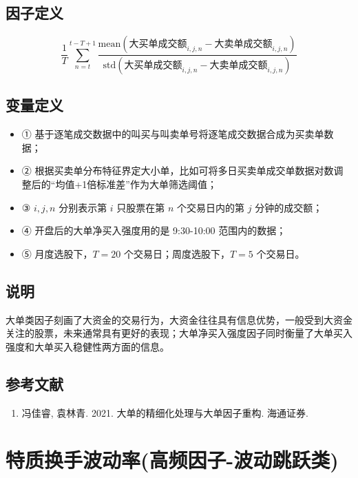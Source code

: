 \documentclass{article}
\begin{document}
\subsection{因子定义}

\begin{equation}
    \frac{1}{T} \sum_{n=t}^{t-T+1} \frac{\mathrm{mean}(\text{大买单成交额}_{i,j,n} - \text{大卖单成交额}_{i,j,n})}{\mathrm{std}(\text{大买单成交额}_{i,j,n} - \text{大卖单成交额}_{i,j,n})}
\end{equation}

\subsection{变量定义}
\begin{itemize}
    \item ① 基于逐笔成交数据中的叫买与叫卖单号将逐笔成交数据合成为买卖单数据；
    \item ② 根据买卖单分布特征界定大小单，比如可将多日买卖单成交单数据对数调整后的“均值+1倍标准差”作为大单筛选阈值；
    \item ③ \( i, j, n \) 分别表示第 \( i \) 只股票在第 \( n \) 个交易日内的第 \( j \) 分钟的成交额；
    \item ④ 开盘后的大单净买入强度用的是 9:30-10:00 范围内的数据；
    \item ⑤ 月度选股下，\( T=20 \) 个交易日；周度选股下，\( T=5 \) 个交易日。
\end{itemize}

\subsection{说明}
大单类因子刻画了大资金的交易行为，大资金往往具有信息优势，一般受到大资金关注的股票，未来通常具有更好的表现；大单净买入强度因子同时衡量了大单买入强度和大单买入稳健性两方面的信息。

\subsection{参考文献}
\begin{enumerate}
    \item 冯佳睿, 袁林青. 2021. 大单的精细化处理与大单因子重构. 海通证券.
\end{enumerate}

\section{特质换手波动率(高频因子-波动跳跃类)}
\end{document}
